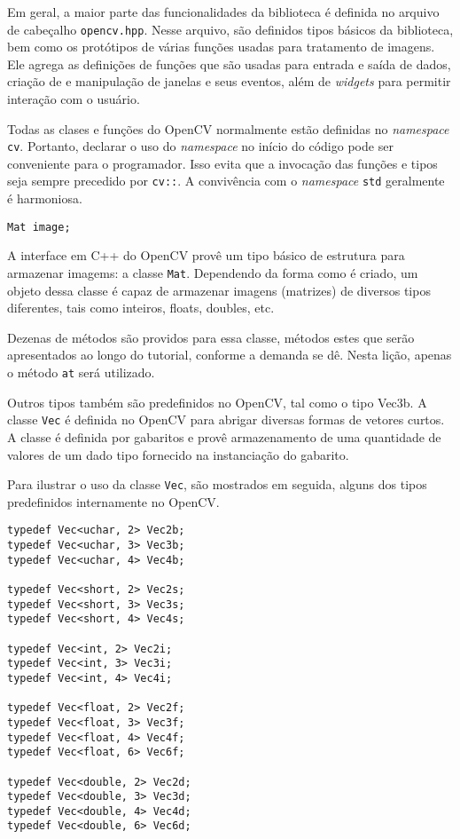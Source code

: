 \documentclass[11pt]{amsbook}
\begin{document}
Em geral, a maior parte das funcionalidades da biblioteca é definida
no arquivo de cabeçalho \texttt{opencv.hpp}. Nesse arquivo, são definidos
tipos básicos da biblioteca, bem como os protótipos de várias funções
usadas para tratamento de imagens. Ele agrega as definições de funções
que são usadas para entrada e saída de dados, criação de e manipulação
de janelas e seus eventos, além de \emph{widgets} para permitir interação
com o usuário.


Todas as clases e funções do OpenCV normalmente estão definidas no
\emph{namespace} \texttt{cv}. Portanto, declarar o uso do \emph{namespace} no início do
código pode ser conveniente para o programador. Isso evita que a
invocação das funções e tipos seja sempre precedido por \texttt{cv::}. A
convivência com o \emph{namespace} \texttt{std} geralmente é harmoniosa.


\begin{verbatim}
Mat image;
\end{verbatim}

A interface em C++ do OpenCV provê um tipo básico de estrutura para
armazenar imagems: a classe \texttt{Mat}. Dependendo da forma como é criado,
um objeto dessa classe é capaz de armazenar imagens (matrizes) de
diversos tipos diferentes, tais como inteiros, floats, doubles, etc.


Dezenas de métodos são providos para essa classe, métodos estes que
serão apresentados ao longo do tutorial, conforme a demanda se
dê. Nesta lição, apenas o método \texttt{at} será utilizado.


Outros tipos também são predefinidos no OpenCV, tal como o tipo
Vec3b. A classe \texttt{Vec} é definida no OpenCV para abrigar diversas
formas de vetores curtos. A classe é definida por gabaritos e provê
armazenamento de uma quantidade de valores de um dado tipo fornecido
na instanciação do gabarito.


Para ilustrar o uso da classe \texttt{Vec}, são mostrados em seguida, alguns
dos tipos predefinidos internamente no OpenCV.


\begin{verbatim}
typedef Vec<uchar, 2> Vec2b;
typedef Vec<uchar, 3> Vec3b;
typedef Vec<uchar, 4> Vec4b;

typedef Vec<short, 2> Vec2s;
typedef Vec<short, 3> Vec3s;
typedef Vec<short, 4> Vec4s;

typedef Vec<int, 2> Vec2i;
typedef Vec<int, 3> Vec3i;
typedef Vec<int, 4> Vec4i;

typedef Vec<float, 2> Vec2f;
typedef Vec<float, 3> Vec3f;
typedef Vec<float, 4> Vec4f;
typedef Vec<float, 6> Vec6f;

typedef Vec<double, 2> Vec2d;
typedef Vec<double, 3> Vec3d;
typedef Vec<double, 4> Vec4d;
typedef Vec<double, 6> Vec6d;
\end{verbatim}
\end{document}
